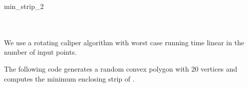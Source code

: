 \begin{ccRefFunction}{min_strip_2}
  \ccSeeAlso
  \\
  \\
  \\
  
  \ccImplementation We use a rotating caliper
   algorithm \cite{t-sgprc-83}
  with worst case running time linear in the number of input points.
    
  \ccExample The following code generates a random convex polygon
   with 20 vertices and computes the minimum enclosing
  strip of .


\end{ccRefFunction}
    
